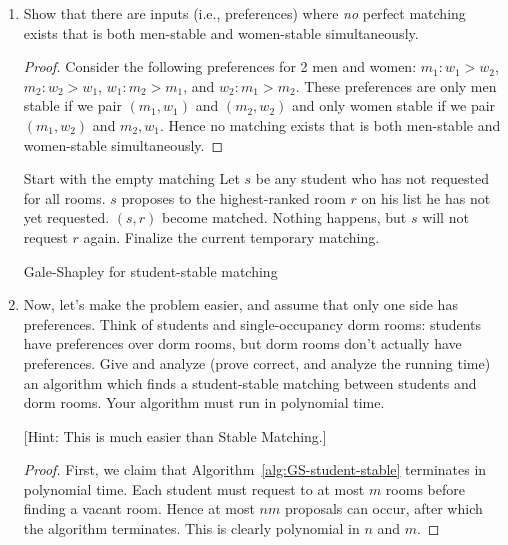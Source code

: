 \documentclass[10pt]{article}
\begin{document}
\begin{enumerate}
\item Show that there are inputs (i.e., preferences) where \emph{no} perfect matching exists that is both men-stable and women-stable simultaneously.

\begin{proof}
  Consider the following preferences for 2 men and women: \(m_1: w_1 > w_2\), \(m_2: w_2 > w_1\), \(w_1: m_2 > m_1\), and \(w_2: m_1 > m_2\). These preferences are only men stable if we pair \((m_1, w_1)\) and \((m_2, w_2)\) and only women stable if we pair \((m_1, w_2)\) and \(m_2, w_1\). Hence no matching exists that is both men-stable and women-stable simultaneously.
\end{proof}

\begin{algorithm}[htb]
  \begin{algorithmic}
    \STATE Start with the empty matching
      \STATE Let $s$ be any student who has not requested for all rooms.
      \STATE $s$ proposes to the highest-ranked room \(r\) on his list he has not yet requested.
        \STATE $(s,r)$ become matched.
      \ELSE
        \STATE Nothing happens, but $s$ will not request $r$ again.  
      \ENDIF
     \ENDWHILE
     \STATE Finalize the current temporary matching.
  \end{algorithmic}
\caption{Gale-Shapley for student-stable matching \label{alg:GS-student-stable}}
\end{algorithm}

\item Now, let's make the problem easier, and assume that only one side has preferences. Think of students and single-occupancy dorm rooms: students have preferences over dorm rooms, but dorm rooms don't actually have preferences.
  Give and analyze (prove correct, and analyze the running time) an algorithm which finds a student-stable matching between students and dorm rooms.
  Your algorithm must run in polynomial time.

  [Hint: This is much easier than Stable Matching.]

\begin{proof}
  First, we claim that Algorithm~\ref{alg:GS-student-stable} terminates in polynomial time. Each student must request to at most \(m\) rooms before finding a vacant room. Hence at most \(nm\) proposals can occur, after which the algorithm terminates. This is clearly polynomial in \(n\) and \(m\).


\end{proof}
\end{enumerate}
\end{document}
